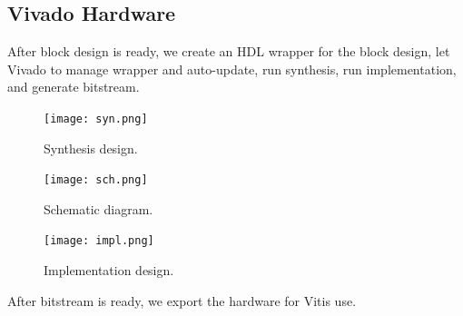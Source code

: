 \documentclass[a4paper]{article}
\begin{document}
\subsection{Vivado Hardware}
After block design is ready, we create an HDL wrapper for the block design, let Vivado to manage wrapper and auto-update, run synthesis, run implementation, and generate bitstream.
\begin{figure}[H]
    \centering
    \texttt{[image: syn.png]}
    \caption{Synthesis design.}
\end{figure}
\begin{figure}[H]
    \centering
    \texttt{[image: sch.png]}
    \caption{Schematic diagram.}
\end{figure}
\begin{figure}[H]
    \centering
    \texttt{[image: impl.png]}
    \caption{Implementation design.}
\end{figure}
After bitstream is ready, we export the hardware for Vitis use.
\end{document}

